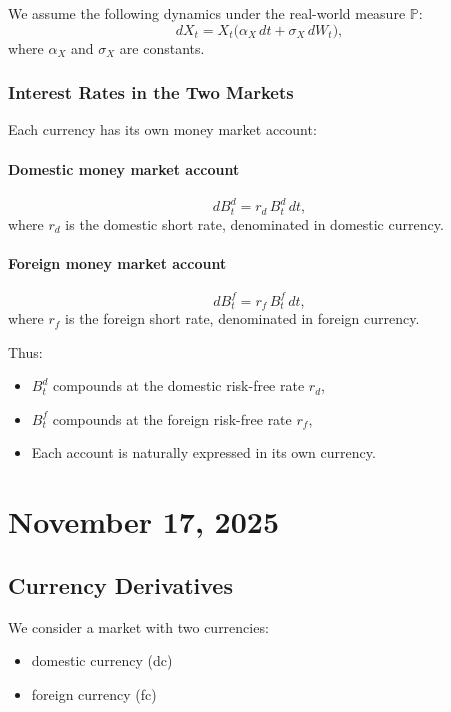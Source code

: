 \documentclass[12pt,a4paper]{article}
\theoremstyle{definition}
\begin{document}
We assume the following dynamics under the real-world measure $\mathbb{P}$:
\[
dX_t = X_t\big(\alpha_X\, dt + \sigma_X\, dW_t\big),
\]
where $\alpha_X$ and $\sigma_X$ are constants.

\subsubsection{Interest Rates in the Two Markets}

Each currency has its own money market account:

\paragraph{Domestic money market account}

\[
dB_t^d = r_d\, B_t^d\, dt,
\]
where $r_d$ is the domestic short rate, denominated in domestic currency.

\paragraph{Foreign money market account}

\[
dB_t^f = r_f\, B_t^f\, dt,
\]
where $r_f$ is the foreign short rate, denominated in foreign currency.

Thus:
\begin{itemize}
\item $B_t^d$ compounds at the domestic risk-free rate $r_d$,
\item $B_t^f$ compounds at the foreign risk-free rate $r_f$,
\item Each account is naturally expressed in its own currency.
\end{itemize}

\newpage
\section{November 17, 2025}

\subsection{Currency Derivatives}

We consider a market with two currencies:
\begin{itemize}
\item domestic currency (dc)
\item foreign currency (fc)
\end{itemize}
\end{document}
